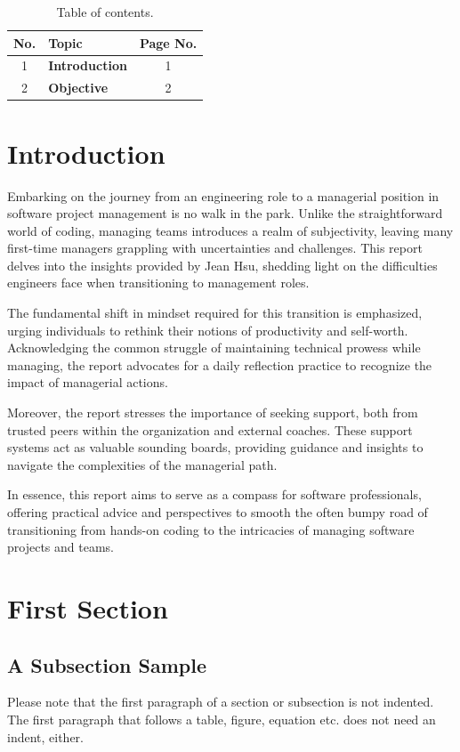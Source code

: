 \documentclass[runningheads]{llncs}
\begin{document}
\begin{table}
\centering
\caption{Table of contents.}\label{tab1}
\begin{tabularx}{\textwidth}{|c|X|c|}
\hline
No. & Topic & Page No.\\
\hline
1 & \textbf{Introduction} & 1\\
2 & \textbf{Objective} & 2\\
\hline
\end{tabularx}
\end{table} 

\section{Introduction}
Embarking on the journey from an engineering role to a managerial position in software project management is no walk in the park. Unlike the straightforward world of coding, managing teams introduces a realm of subjectivity, leaving many first-time managers grappling with uncertainties and challenges. This report delves into the insights provided by Jean Hsu, shedding light on the difficulties engineers face when transitioning to management roles.

The fundamental shift in mindset required for this transition is emphasized, urging individuals to rethink their notions of productivity and self-worth. Acknowledging the common struggle of maintaining technical prowess while managing, the report advocates for a daily reflection practice to recognize the impact of managerial actions.

Moreover, the report stresses the importance of seeking support, both from trusted peers within the organization and external coaches. These support systems act as valuable sounding boards, providing guidance and insights to navigate the complexities of the managerial path.

In essence, this report aims to serve as a compass for software professionals, offering practical advice and perspectives to smooth the often bumpy road of transitioning from hands-on coding to the intricacies of managing software projects and teams.



\section{First Section}
\subsection{A Subsection Sample}
Please note that the first paragraph of a section or subsection is
not indented. The first paragraph that follows a table, figure,
equation etc. does not need an indent, either.
\end{document}
